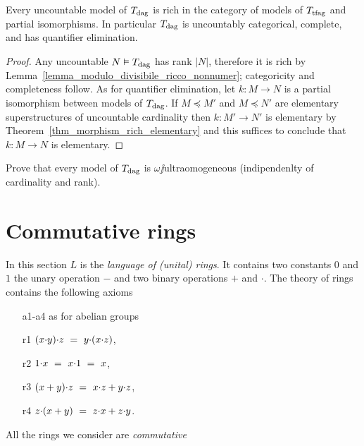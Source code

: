 \documentclass[creche.tex]{subfiles}
\begin{document}
\begin{corollary}\label{corol_ModDivUltraOmog}
Every uncountable model of $T_{\rm dag}$ is rich in the category of models of $T_{\rm tfag}$ and partial isomorphisms. In particular $T_{\rm dag}$ is uncountably categorical, complete, and has quantifier elimination.
\end{corollary}
\begin{proof}
Any uncountable $N\models T_{\rm dag}$ has rank $|N|$, therefore it is rich by Lemma~\ref{lemma_modulo_divisibile_ricco_nonnumer}; categoricity and completeness follow. As for quantifier elimination, let $k:M\to N$ is a partial isomorphism between models of $T_{\rm dag}$. If $M\preceq M'$ and $M\preceq N'$ are elementary superstructures of uncountable cardinality then $k:M'\to N'$ is elementary by Theorem~\ref{thm_morphism_rich_elementary} and this suffices to conclude that  $k:M\to N$ is elementary. 
\end{proof}

\begin{exercise}
Prove that every model of $T_{\rm dag}$ is $\omega\jj$ultraomogeneous (indipendenlty of cardinality and rank).\QED
\end{exercise}

\section{Commutative rings}
\label{anelli}

In this section $L$ is the \emph{language of (unital) rings}. It contains two constants $0$ and $1$ the unary operation $-$ and two binary operations $+$ and $\cdot$. The theory of rings contains the following axioms

\begin{itemize}
\item[a1-a4] as for abelian groups
\item[r1] $(x\mdot y)\mdot z\  =\ y\mdot(x\mdot z)$,
\item[r2] $1\mdot x\ =\ x\mdot 1\ =\ x$,
\item[r3] $(x+y)\mdot z\ =\ x\mdot z + y\mdot z$,
\item[r4] $z\mdot (x+y)\ =\ z\mdot x + z\mdot y$.
\end{itemize}

All the rings we consider are \emph{commutative\/} 
\end{document}
